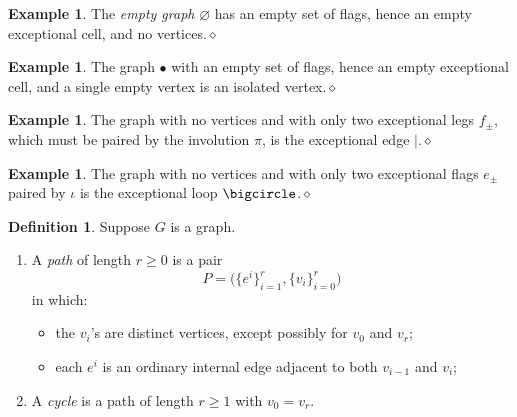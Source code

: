 \documentclass{amsbook}
\numberwithin{section}{chapter}
\numberwithin{subsection}{section}
\numberwithin{equation}{section}
\theoremstyle{plain}
\theoremstyle{definition}
\newtheorem{definition}[equation]{Definition}
\newtheorem{example}[equation]{Example}
\newcommand{\edge}{\vert}
\newcommand{\dqed}{\hfill$\diamond$}
\begin{document}
\begin{example}\label{ex:basic-empty} The \emph{empty graph} $\varnothing$ \label{notation:empty-graph} has an empty set of flags, hence an empty exceptional cell, and no vertices.\dqed\end{example}

\begin{example}\label{ex:basic-isolated-vertex} The graph $\bullet$ with an empty set of flags, hence an empty exceptional cell, and a single empty vertex is an isolated vertex.\dqed\end{example}

\begin{example}\label{ex:basic-exceptional-edge} The graph with no vertices and with only two exceptional legs $f_{\pm}$, which must be paired by the involution $\pi$, is the exceptional edge $\edge$.\dqed\end{example}

\begin{example}\label{ex:basic-exceptional-loop} The graph with no vertices and with only two exceptional flags $e_{\pm}$ paired by $\iota$ is the exceptional loop $\bigcircle$.\dqed\end{example}

\begin{definition}\label{def:path} Suppose $G$ is a graph.
\begin{enumerate}\item A \emph{path} of length $r \geq 0$ is a pair \[P = \bigl(\{e^i\}_{i=1}^r, \{v_i\}_{i=0}^r\bigr)\] in which:
\begin{itemize} \item the $v_i$'s are distinct vertices, except possibly for $v_0$ and $v_r$;
\item each $e^i$ is an ordinary internal edge adjacent to both $v_{i-1}$ and $v_i$;
\end{itemize}
\item A \emph{cycle} is a path of length $r \geq 1$ with $v_0=v_r$.
\end{enumerate}\end{definition}
\end{document}

